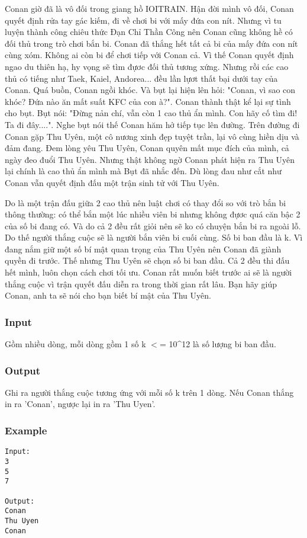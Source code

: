 



   Conan giờ đã là vô đối trong giang hồ IOITRAIN. Hận đời mình vô đối, Conan quyết định rửa tay gác kiếm, đi về chơi bi với mấy đứa con nít. Nhưng vì tu luyện thành công chiêu thức Đạn Chỉ Thần Công nên Conan cũng không hề có đối thủ trong trò chơi bắn bi. Conan đã thắng hết tất cả bi của mấy đứa con nít cùng xóm. Không ai còn bi để chơi tiếp với Conan cả. Vì thế Conan quyết định ngao du thiên hạ, hy vọng sẽ tìm đựơc đối thủ tương xứng. Nhưng rồi các cao thủ có tiếng như Taek, Kaiel, Andorea... đều lần lựơt thất bại dưới tay của Conan. Quá buồn, Conan ngồi khóc. Và bụt lại hiện lên hỏi: "Conan, vì sao con khóc? Đứa nào ăn mất suất KFC của con à?". Conan thành thật kể lại sự tình cho bụt. Bụt nói: "Đừng nản chí, vẫn còn 1 cao thủ ẩn mình. Con hãy cố tìm đi! Ta đi đây....". Nghe bụt nói thế Conan hăm hở tiếp tục lên đường. Trên đường đi Conan gặp Thu Uyên, một cô nương xinh đẹp tuyệt trần, lại vô cùng hiền dịu và đảm đang. Đem lòng yêu Thu Uyên, Conan quyên mất mục đích của mình, cả ngày đeo đuổi Thu Uyên. Nhưng thật không ngờ Conan phát hiện ra Thu Uyên lại chính là cao thủ ẩn mình mà Bụt đã nhắc đến. Dù lòng đau như cắt như Conan vẫn quyết định đấu một trận sinh tử với Thu Uyên.  

   Do là một trận đấu giữa 2 cao thủ nên luật chơi có thay đổi so với trò bắn bi thông thường: có thể bắn một lúc nhiều viên bi nhưng không đựơc quá căn bậc 2 của số bi đang có. Và do cả 2 đều rất giỏi nên sẽ ko có chuyện bắn bi ra ngoài lỗ. Do thế người thắng cuộc sẽ là người bắn viên bi cuối cùng. Số bi ban đầu là k. Vì đang nắm giữ một số bí mật quan trọng của Thu Uyên nên Conan đã giành quyền đi trước. Thế nhưng Thu Uyên sẽ chọn số bi ban đầu. Cả 2 đều thi đấu hết mình, luôn chọn cách chơi tối ưu. Conan rất muốn biết trước ai sẽ là người thắng cuộc vì trận quyết đấu diễn ra trong thời gian rất lâu. Bạn hãy giúp Conan, anh ta sẽ nói cho bạn biết bí mật của Thu Uyên.  

\subsubsection{   Input  }

   Gồm nhiều dòng, mỗi dòng gồm 1 số k $<$= 10\textasciicircum12 là số lượng bi ban đầu.  

\subsubsection{   Output  }

   Ghi ra người thắng cuộc tương ứng với mỗi số k trên 1 dòng. Nếu Conan thắng in ra 'Conan', ngược lại in ra 'Thu Uyen'.  

\subsubsection{   Example  }
\begin{verbatim}
Input:
3 
5
7

Output:
Conan
Thu Uyen
Conan
\end{verbatim}